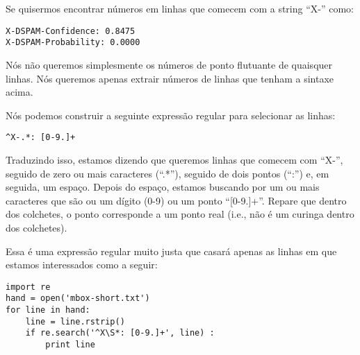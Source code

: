 Se quisermos encontrar números em linhas que comecem com a string ``X-'' como:

\beforeverb
\begin{verbatim}
X-DSPAM-Confidence: 0.8475
X-DSPAM-Probability: 0.0000  
\end{verbatim}
\afterverb
%

Nós não queremos simplesmente os números de ponto flutuante de quaisquer linhas. 
Nós queremos apenas extrair números de linhas que tenham a sintaxe acima.

Nós podemos construir a seguinte expressão regular para selecionar as linhas:

\beforeverb
\begin{verbatim}
^X-.*: [0-9.]+
\end{verbatim}
\afterverb
%

Traduzindo isso, estamos dizendo que queremos linhas que comecem com ``X-'', seguido de
zero ou mais caracteres (``.*''), seguido de dois pontos (``:'') e, em seguida, um espaço. 
Depois do espaço, estamos buscando por um ou mais caracteres que são ou um dígito (0-9) ou um 
ponto ``[0-9.]+''. Repare que dentro dos colchetes, o ponto corresponde a um ponto real (i.e., 
não é um curinga dentro dos colchetes).

Essa é uma expressão regular muito justa que casará apenas as linhas em que estamos interessados
como a seguir:

\beforeverb
\begin{verbatim}
import re
hand = open('mbox-short.txt')
for line in hand:
    line = line.rstrip()
    if re.search('^X\S*: [0-9.]+', line) :
        print line
\end{verbatim}
\afterverb
%

